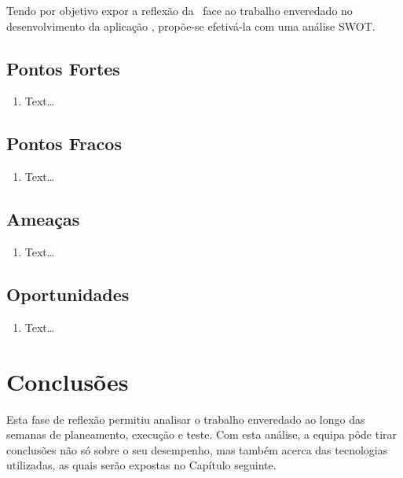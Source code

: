 Tendo por objetivo expor a reflexão da \groupname~face ao trabalho enveredado no desenvolvimento da aplicação \theapp, propõe-se efetivá-la com uma análise \ac{SWOT}.

\subsection{Pontos Fortes}
\label{ssec::reflexao:critica:fortes}

\begin{enumerate}[nosep]
	\item Text\ldots
\end{enumerate}


\subsection{Pontos Fracos}
\label{ssec::reflexao:critica:fracos}

\begin{enumerate}[nosep]
	\item Text\ldots
\end{enumerate}


\subsection{Ameaças}
\label{ssec::reflexao:critica:ameacas}

\begin{enumerate}[nosep]
	\item Text\ldots
\end{enumerate}


\subsection{Oportunidades}
\label{ssec::reflexao:critica:oportunidades}

\begin{enumerate}[nosep]
	\item Text\ldots
\end{enumerate}



\section{Conclusões}
\label{sec::reflexao:conclusao}

Esta fase de reflexão permitiu analisar o trabalho enveredado ao longo das semanas de planeamento, execução e teste. Com esta análise, a equipa pôde tirar conclusões não só sobre o seu desempenho, mas também acerca das tecnologias utilizadas, as quais serão expostas no Capítulo seguinte.
